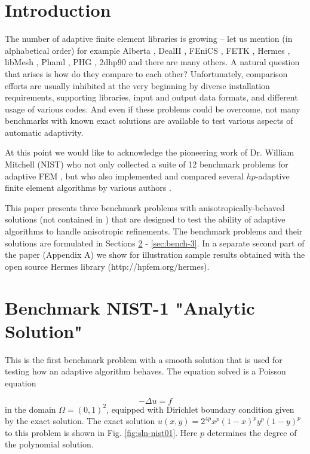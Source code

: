 \documentclass[12pt]{elsarticle}
\begin{document}

\section{Introduction}
\label{sec:intro}

The number of adaptive finite element libraries is growing
-- let us mention (in alphabetical order) for example Alberta
\cite{alberta}, DealII \cite{dealii}, FEniCS
\cite{fenics}, FETK \cite{fetk}, Hermes \cite{hermes}, libMesh \cite{libmesh},
Phaml \cite{phaml}, PHG \cite{phg}, 2dhp90 \cite{2dhp90} and there are many others.
A natural question that arises is how do they compare to each other?
Unfortunately, comparison efforts are usually inhibited at the very beginning
by diverse installation requirements, supporting libraries, input and output
data formats, and different usage of various codes. And even if these problems
could be overcome, not many benchmarks with known exact solutions are
available to test various aspects of automatic adaptivity.

At this point we would like to acknowledge the pioneering work of Dr. William Mitchell
(NIST) who not only collected a suite of 12 benchmark problems
for adaptive FEM \cite{mitchell-1}, but who also implemented
and compared several $hp$-adaptive finite element algorithms by various
authors \cite{mitchell-2}.

This paper presents three benchmark problems with anisotropically-be\-ha\-ved
solutions (not contained in \cite{mitchell-1}) that are
designed to test the ability of adaptive algorithms to
handle anisotropic refinements. The benchmark problems and their
solutions are formulated in Sections \ref{sec:bench-1} - \ref{sec:bench-3}.
In a separate second part of the paper (Appendix A) we show for illustration
sample results obtained with the open source {\sc Hermes} library (http://hpfem.org/hermes).

\section{Benchmark NIST-1 "Analytic Solution"}
\label{sec:bench-1}

This is the first benchmark problem with a smooth solution
that is used for testing how an adaptive algorithm behaves.
The equation solved is a Poisson equation

\begin{equation} \label{poisson}
-\Delta u = f
\end{equation}
in the domain $\Omega = (0, 1)^2$, equipped with Dirichlet
boundary condition given by the exact solution.
The exact solution $u(x, y) = 2^{4p}x^{p}(1-x)^{p}y^{p}(1-y)^{p}$
to this problem is shown in Fig. \ref{fig:sln-nist01}.
Here $p$ determines the degree of the polynomial solution.
\end{document}
